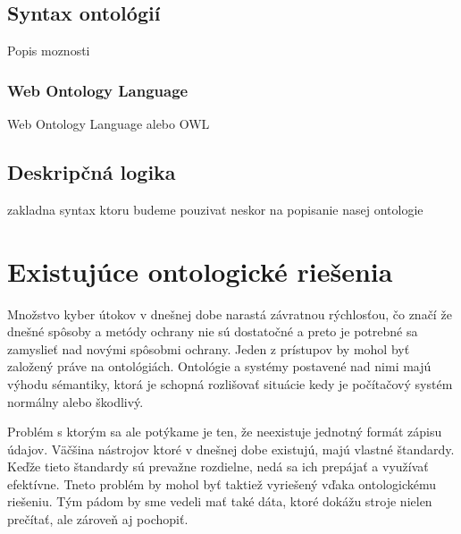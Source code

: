 \documentclass[12pt, a4paper, oneside]{book}
\begin{document}




\section{Syntax ontológií}
Popis moznosti

\subsection{Web Ontology Language}
Web Ontology Language alebo OWL



\section{Deskripčná logika}
zakladna syntax ktoru budeme pouzivat neskor na popisanie nasej ontologie

\chapter{Existujúce ontologické riešenia}
Množstvo kyber útokov v dnešnej dobe narastá závratnou rýchlosťou, čo značí že dnešné spôsoby a metódy ochrany nie sú dostatočné a preto je potrebné sa zamyslieť nad novými spôsobmi ochrany. Jeden z prístupov by mohol byť založený práve na ontológiách. Ontológie a systémy postavené nad nimi majú výhodu sémantiky, ktorá je schopná rozlišovať situácie kedy je počítačový systém normálny alebo škodlivý.


Problém s ktorým sa ale potýkame je ten, že neexistuje jednotný formát zápisu údajov. Väčšina nástrojov ktoré v dnešnej dobe existujú, majú vlastné štandardy. Keďže tieto štandardy sú prevažne rozdielne, nedá sa ich prepájať a využívať efektívne. Tneto problém by mohol byť taktiež vyriešený vďaka ontologickému riešeniu. Tým pádom by sme vedeli mať také dáta, ktoré dokážu stroje nielen prečítať, ale zároveň aj pochopiť. 
 
\end{document}
